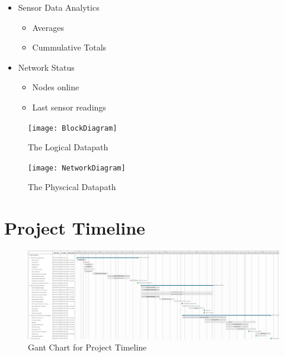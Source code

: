 \begin{itemize}
\begin{itemize}
		 	\end{itemize}
		 	\item Sensor Data Analytics
		 	\begin{itemize}
		 		\item Averages
		 		\item Cummulative Totals
		 	\end{itemize}
		 	\item Network Status
		 	\begin{itemize}
		 		\item Nodes online
		 		\item Last sensor readings
		 	\end{itemize}
		 \end{itemize}
	 
		\begin{figure}[h!]
			\centering
			\texttt{[image: BlockDiagram]}
			\caption{The Logical Datapath}
			\label{fig:BlockDiagram}
		\end{figure}
		
		\clearpage
		
		\begin{figure}[h!]
			\centering
			\texttt{[image: NetworkDiagram]}
			\caption{The Physcical Datapath}
			\label{fig:NetworkDiagram}
		\end{figure}
		
		\clearpage
		 
	\section{Project Timeline}
	
		\begin{figure}[h!]
			\centering
			\includegraphics[width=0.85\textheight, angle=90]{GantChart}
			\caption{Gant Chart for Project Timeline}
			\label{fig:GantChart}
		\end{figure}
		 
